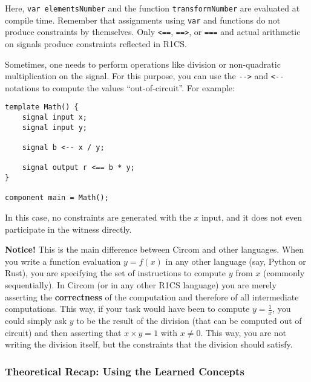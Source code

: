 \documentclass[../lecture-notes.tex]{subfiles}
\begin{document}
    Here, \texttt{var elementsNumber} and the function \texttt{transformNumber}
    are evaluated at compile time. Remember that assignments using \texttt{var} and
    functions do not produce constraints by themselves. Only \texttt{<==},
    \texttt{==>}, or \texttt{===} and actual arithmetic on signals produce
    constraints reflected in R1CS.

    \begin{remark}
        Sometimes, one needs to perform operations like division or non-quadratic multiplication on the signal.
        For this purpose, you can use the \texttt{{-}->} and \texttt{<-{-}} notations to compute the values ``out-of-circuit''. For example:

        \begin{lstlisting}[language=Circom,numbers=none]
template Math() {
    signal input x;
    signal input y;

    signal b <-- x / y;

    signal output r <== b * y;
}

component main = Math();
        \end{lstlisting}\label{code:division-example}

        In this case, no constraints are generated with the $x$ input, and it does not even participate in the witness directly.

        \textcolor{green!50!black}{\textbf{Notice!}} This is the main difference between Circom and other languages. When you
        write a function evaluation $y = f(x)$ in any other language (say, Python or Rust),
        you are specifying the set of instructions to compute $y$ from $x$ (commonly
        sequentially). In Circom (or in any other R1CS language) you are merely asserting
        the \textbf{correctness} of the computation and therefore of all
        intermediate computations. This way, if your task would have been to compute
        $y = \frac{1}{x}$, you could simply ask $y$ to be the result of the division
        (that can be computed out of circuit) and then asserting that $x \times y = 1$
        with $x \neq 0$. This way, you are not writing the division itself, but
        the constraints that the division should satisfy.
    \end{remark}

    \subsubsection{Theoretical Recap: Using the Learned Concepts}
\end{document}
